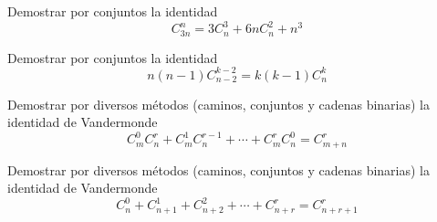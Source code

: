 \documentclass[12pt]{article}
\begin{document}
\begin{problema}
Demostrar por conjuntos la identidad
\[C^n_{3n}=3C^3_{n}+6nC^2_n+n^3\]
\end{problema}

\begin{problema}
    Demostrar por conjuntos la identidad
\[n(n-1)C^{k-2}_{n-2}=k(k-1)C^k_n\]
\end{problema}

\begin{problema}
    Demostrar por diversos métodos (caminos, conjuntos y cadenas binarias) la identidad de Vandermonde
    \[C^0_mC^r_n+C^1_mC^{r-1}_n+\cdots+C^r_mC^0_n=C^r_{m+n}\]
\end{problema}

\begin{problema}
    Demostrar por diversos métodos (caminos, conjuntos y cadenas binarias) la identidad de Vandermonde
    \[C^0_n+C^1_{n+1}+C^2_{n+2}+\cdots+C^r_{n+r}=C^r_{n+r+1}\]
\end{problema}
\end{document}
